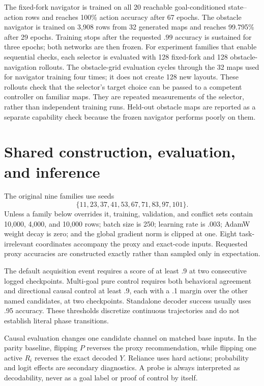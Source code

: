 The fixed-fork navigator is trained on all 20 reachable goal-conditioned state--action rows and reaches 100\% action accuracy after 67 epochs. The obstacle navigator is trained on 3,908 rows from 32 generated maps and reaches 99.795\% after 29 epochs. Training stops after the requested $.99$ accuracy is sustained for three epochs; both networks are then frozen. For experiment families that enable sequential checks, each selector is evaluated with 128 fixed-fork and 128 obstacle-navigation rollouts. The obstacle-grid evaluation cycles through the 32 maps used for navigator training four times; it does not create 128 new layouts. These rollouts check that the selector's target choice can be passed to a competent controller on familiar maps. They are repeated measurements of the selector, rather than independent training runs. Held-out obstacle maps are reported as a separate capability check because the frozen navigator performs poorly on them.

\section{Shared construction, evaluation, and inference}

The original nine families use seeds
\[
\{11,23,37,41,53,67,71,83,97,101\}.
\]
Unless a family below overrides it, training, validation, and conflict sets contain 10,000, 4,000, and 10,000 rows; batch size is 250; learning rate is .003; AdamW weight decay is zero; and the global gradient norm is clipped at one. Eight task-irrelevant coordinates accompany the proxy and exact-code inputs. Requested proxy accuracies are constructed exactly rather than sampled only in expectation.

The default acquisition event requires a score of at least .9 at two consecutive logged checkpoints. Multi-goal pure control requires both behavioral agreement and directional causal control at least .9, each with a .1 margin over the other named candidates, at two checkpoints. Standalone decoder success usually uses .95 accuracy. These thresholds discretize continuous trajectories and do not establish literal phase transitions.

Causal evaluation changes one candidate channel on matched base inputs. In the parity baseline, flipping $P$ reverses the proxy recommendation, while flipping one active $R_i$ reverses the exact decoded $Y$. Reliance uses hard actions; probability and logit effects are secondary diagnostics. A probe is always interpreted as decodability, never as a goal label or proof of control by itself.

